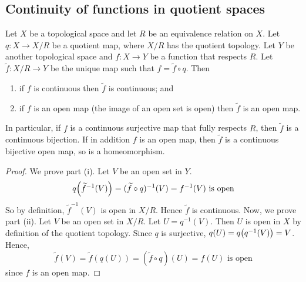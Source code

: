 \subsection{Continuity of functions in quotient spaces}
\begin{proposition}
	Let \( X \) be a topological space and let \( R \) be an equivalence relation on \( X \).
	Let \( q \colon X \to X/R \) be a quotient map, where \( X/R \) has the quotient topology.
	Let \( Y \) be another topological space and \( f \colon X \to Y \) be a function that respects \( R \).
	Let \( \widetilde f \colon X/R \to Y \) be the unique map such that \( f = \widetilde f \circ q \).
	Then
	\begin{enumerate}
		\item if \( f \) is continuous then \( \widetilde f \) is continuous; and
		\item if \( f \) is an open map (the image of an open set is open) then \( \widetilde f \) is an open map.
	\end{enumerate}
	In particular, if \( f \) is a continuous surjective map that fully respects \( R \), then \( \widetilde f \) is a continuous bijection.
	If in addition \( f \) is an open map, then \( \widetilde f \) is a continuous bijective open map, so is a homeomorphism.
\end{proposition}
\begin{proof}
	We prove part (i).
	Let \( V \) be an open set in \( Y \).
	\[
		q\qty(\widetilde f^{-1}(V)) = (\widetilde f \circ q)^{-1}(V) = f^{-1}(V) \text{ is open}
	\]
	So by definition, \( \widetilde f^{-1}(V) \) is open in \( X/R \).
	Hence \( \widetilde f \) is continuous.
	Now, we prove part (ii).
	Let \( V \) be an open set in \( X/R \).
	Let \( U = q^{-1}(V) \).
	Then \( U \) is open in \( X \) by definition of the quotient topology.
	Since \( q \) is surjective, \( q(U) = q\qty(q^{-1}(V)) = V \).
	Hence,
	\[
		\widetilde f(V) = \widetilde f(q(U)) = (\widetilde f \circ q)(U) = f(U) \text{ is open}
	\]
	since \( f \) is an open map.
\end{proof}
